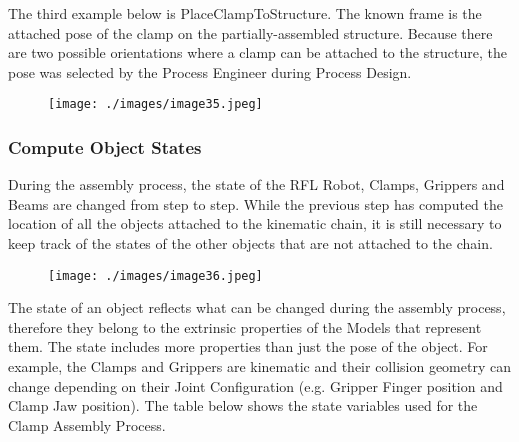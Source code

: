 The third example below is PlaceClampToStructure. The known frame is the attached pose of the clamp on the partially-assembled structure. Because there are two possible orientations where a clamp can be attached to the structure, the pose was selected by the Process Engineer during Process Design.

\begin{figure}[H]
\texttt{[image: ./images/image35.jpeg]}
\end{figure}


\subsubsection{Compute Object States}

During the assembly process, the state of the RFL Robot, Clamps, Grippers and Beams are changed from step to step. While the previous step has computed the location of all the objects attached to the kinematic chain, it is still necessary to keep track of the states of the other objects that are not attached to the chain.

\begin{figure}[H]
\texttt{[image: ./images/image36.jpeg]}
\end{figure}


The state of an object reflects what can be changed during the assembly process, therefore they belong to the extrinsic properties of the Models that represent them. The state includes more properties than just the pose of the object. For example, the Clamps and Grippers are kinematic and their collision geometry can change depending on their Joint Configuration (e.g. Gripper Finger position and Clamp Jaw position). The table below shows the state variables used for the Clamp Assembly Process.

